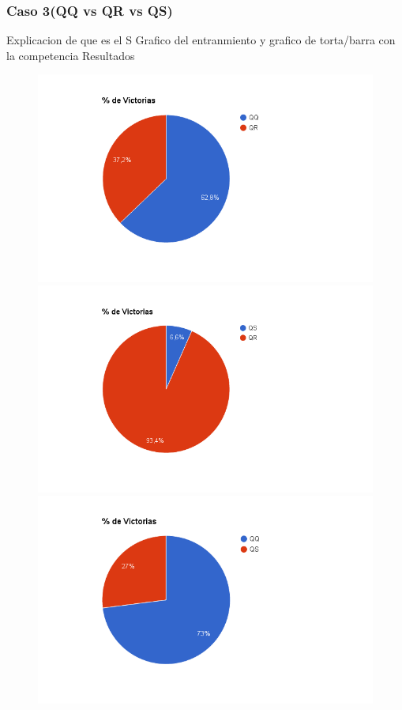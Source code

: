 \documentclass[10pt, a4paper]{article}
\begin{document}
\subsubsection{Caso 3(QQ vs QR vs QS)}

Explicacion de que es el S Grafico del entranmiento y grafico de torta/barra con la competencia Resultados

\begin{figure}[ht]
  \begin{minipage}[c]{1\textwidth}
  \includegraphics[scale=0.4]{QQvsQR.png}
  \includegraphics[scale=0.4]{QRvsQS.png}
  \includegraphics[scale=0.4]{QQvsQS.png}
  \end{minipage}
\end{figure}
\end{document}
